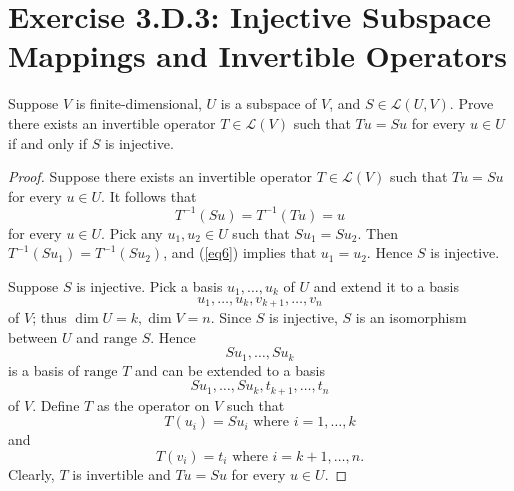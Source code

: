 \section{Exercise 3.D.3: Injective Subspace Mappings and Invertible Operators}
Suppose $V$ is finite-dimensional, $U$ is a subspace of $V$, and $S\in\mathcal{L}(U,V)$. Prove there exists an invertible operator $T\in\mathcal{L}(V)$ such that $Tu=Su$ for every $u\in U$ if and only if $S$ is injective.
\begin{proof}
Suppose there exists an invertible operator $T\in\mathcal{L}(V)$ such that $Tu=Su$ for every $u\in U$. It follows that
\begin{equation}\label{eq6}
T^{-1}(Su)=T^{-1}(Tu)=u
\end{equation}
for every $u\in U$. Pick any $u_1,u_2\in U$ such that $Su_1=Su_2$. Then $T^{-1}(Su_1)=T^{-1}(Su_2)$, and (\ref{eq6}) implies that $u_1=u_2$. Hence $S$ is injective.

Suppose $S$ is injective. Pick a basis $u_1,\dots,u_k$ of $U$ and extend it to a basis\[
u_1,\dots,u_k,v_{k+1},\dots,v_n
\]of $V$; thus $\dim U = k, \dim V=n$. Since $S$ is injective, $S$ is an isomorphism between $U$ and $\text{range }S$. Hence \[
Su_1,\dots,Su_k
\]is a basis of $\text{range }T$ and can be extended to a basis\[
Su_1,\dots,Su_k,t_{k+1},\dots,t_{n}
\]of $V$. Define $T$ as the operator on $V$ such that\[
T(u_i)=Su_i\text{ where }i=1,\dots,k
\]and\[
T(v_i)=t_i\text{ where }i=k+1,\dots,n.
\]Clearly, $T$ is invertible and $Tu=Su$ for every $u\in U$.
\end{proof}
